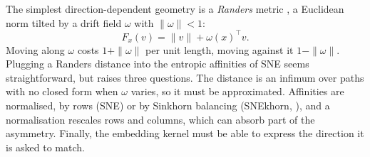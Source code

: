 The simplest direction-dependent geometry is a \emph{Randers} metric
\citep{randers1941asymmetrical,bao2000introduction}, a Euclidean norm
tilted by a drift field $\omega$ with $\|\omega\|<1$:
\begin{equation}
  F_x(v)=\|v\|+\omega(x)^\top v .
  \label{eq:randers}
\end{equation}
Moving along $\omega$ costs $1+\|\omega\|$ per unit length, moving
against it $1-\|\omega\|$. Plugging a Randers distance into the
entropic affinities of SNE seems straightforward, but raises three
questions. The distance is an infimum over paths with no closed form
when $\omega$ varies, so it must be approximated. Affinities are
normalised, by rows (SNE) or by Sinkhorn balancing (SNEkhorn,
\citealt{vanassel2023snekhorn}), and a normalisation rescales rows and
columns, which can absorb part of the asymmetry. Finally, the embedding
kernel must be able to express the direction it is asked to match.

